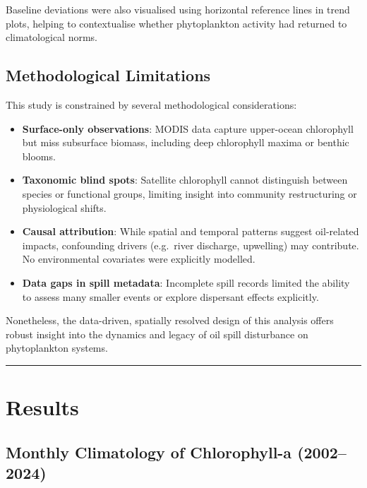 \documentclass[
  11pt,
]{article}
\begin{document}
Baseline deviations were also visualised using horizontal reference
lines in trend plots, helping to contextualise whether phytoplankton
activity had returned to climatological norms.

\subsection{Methodological
Limitations}\label{methodological-limitations}

This study is constrained by several methodological considerations:

\begin{itemize}
\item
  \textbf{Surface-only observations}: MODIS data capture upper-ocean
  chlorophyll but miss subsurface biomass, including deep chlorophyll
  maxima or benthic blooms.
\item
  \textbf{Taxonomic blind spots}: Satellite chlorophyll cannot
  distinguish between species or functional groups, limiting insight
  into community restructuring or physiological shifts.
\item
  \textbf{Causal attribution}: While spatial and temporal patterns
  suggest oil-related impacts, confounding drivers (e.g.~river
  discharge, upwelling) may contribute. No environmental covariates were
  explicitly modelled.
\item
  \textbf{Data gaps in spill metadata}: Incomplete spill records limited
  the ability to assess many smaller events or explore dispersant
  effects explicitly.
\end{itemize}

Nonetheless, the data-driven, spatially resolved design of this analysis
offers robust insight into the dynamics and legacy of oil spill
disturbance on phytoplankton systems.

\begin{center}\rule{0.5\linewidth}{0.5pt}\end{center}

\section{Results}\label{results}

\subsection{Monthly Climatology of Chlorophyll-a
(2002--2024)}\label{monthly-climatology-of-chlorophyll-a-20022024}
\end{document}
